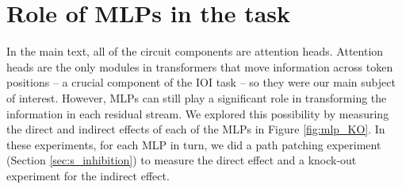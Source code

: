 






\section{Role of MLPs in the task} 
\label{app:mlp}
In the main text, all of the circuit components are attention heads. Attention heads are the only modules in transformers that move information across token positions -- a crucial component of the IOI task -- so they were our main subject of interest. However, MLPs can still play a significant role in transforming the information in each residual stream. We explored this possibility by measuring the direct and indirect effects of each of the MLPs in Figure \ref{fig:mlp_KO}. In these experiments, for each MLP in turn, we did a path patching experiment (Section \ref{sec:s_inhibition}) to measure the direct effect and a knock-out experiment for the indirect effect.


